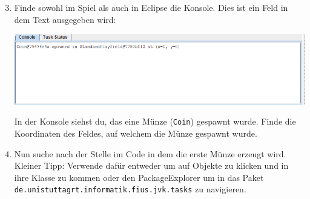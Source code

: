     \begin{enumerate}\setcounter{enumi}{2}

    \item Finde sowohl im Spiel als auch in Eclipse die Konsole. Dies ist ein Feld in dem Text ausgegeben wird:
    \begin{center}
        \includegraphics[width=\linewidth]{./figures/console.PNG}
    \end{center}

    In der Konsole siehst du, das eine Münze (\texttt{Coin}) gespawnt wurde. Finde die Koordinaten des Feldes, auf welchem die Münze gespawnt wurde.

    \item Nun suche nach der Stelle im Code in dem die erste Münze erzeugt wird. Kleiner Tipp: Verwende dafür  entweder  um auf Objekte zu klicken und in ihre Klasse zu kommen oder den PackageExplorer um in das Paket \texttt{de.unistuttagrt.informatik.fius.jvk.tasks} zu navigieren.
\end{enumerate}

